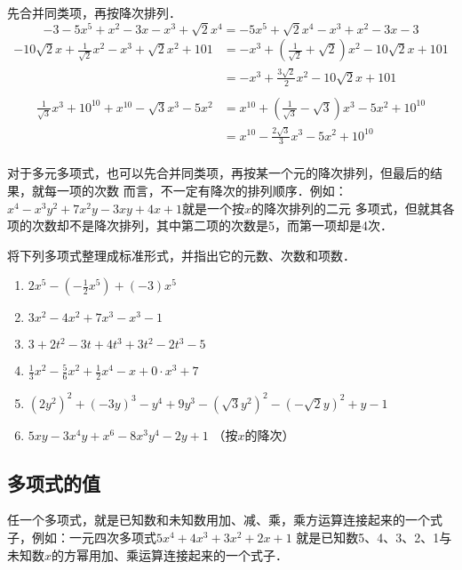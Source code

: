 \begin{solution}
    先合并同类项，再按降次排列．
\[
   -3-5x^5+x^2-3x-x^3+\sqrt{2}x^4=-5x^5+\sqrt{2}x^4-x^3+x^2-3x-3
\]
\[\begin{split}
  -10\sqrt{2}x+\frac{1}{\sqrt{2}}x^2-x^3+\sqrt{2}x^2+101
    &=-x^3+\left(\frac{1}{\sqrt{2}}+\sqrt{2}\right)x^2-10\sqrt{2}x+101\\
    &=-x^3+\frac{3\sqrt{2}}{2}x^2-10\sqrt{2}x+101\\
\end{split}\]
\[\begin{split}
  \frac{1}{\sqrt{3}}x^3+10^{10}+x^{10}-\sqrt{3}x^3-5x^2
    &=x^{10}+\left(\frac{1}{\sqrt{3}}-\sqrt{3}\right)x^3-5x^2+10^{10}\\
    &=x^{10}-\frac{2\sqrt{3}}{3}x^3-5x^2+10^{10}\\
\end{split}\]

\end{solution}

对于多元多项式，也可以先合并同类项，再按某一个元的降次排列，但最后的结果，就每一项的次数
而言，不一定有降次的排列顺序．例如：$x^4-x^3y^2+7x^2y-3xy+4x+1$就是一个按$x$的降次排列的二元
多项式，但就其各项的次数却不是降次排列，其中第二项的次数是5，而第一项却是4次．

\begin{ex}
    将下列多项式整理成标准形式，并指出它的元数、次数和项数．
    \begin{enumerate}
        \item $2x^5-\left(-\frac{1}{2}x^5\right)+(-3)x^5$
        \item $3x^2-4x^2+7x^3-x^3-1$
        \item $3+2t^2-3t+4t^3+3t^2-2t^3-5$
        \item $\frac{1}{3}x^2-\frac{5}{6}x^2+\frac{1}{2}x^4-x+0\cdot x^3+7$
        \item $(2y^2)^2+(-3y)^3-y^4+9y^3-\left(\sqrt{3}y^2\right)^2-\left(-\sqrt{2}y\right)^2+y-1$
        \item $5xy-3x^4y+x^6-8x^3y^4-2y+1$ （按$x$的降次）
    \end{enumerate}
\end{ex}

\subsection{多项式的值}
任一个多项式，就是已知数和未知数用加、减、乘，乘方运算连接起来的一个式子，例如：一元四次多项式$5x^4+4x^3+3x^2+2x+1$
就是已知数5、4、3、2、1与未知数$x$的方幂用加、乘运算连接起来的一个式子．

